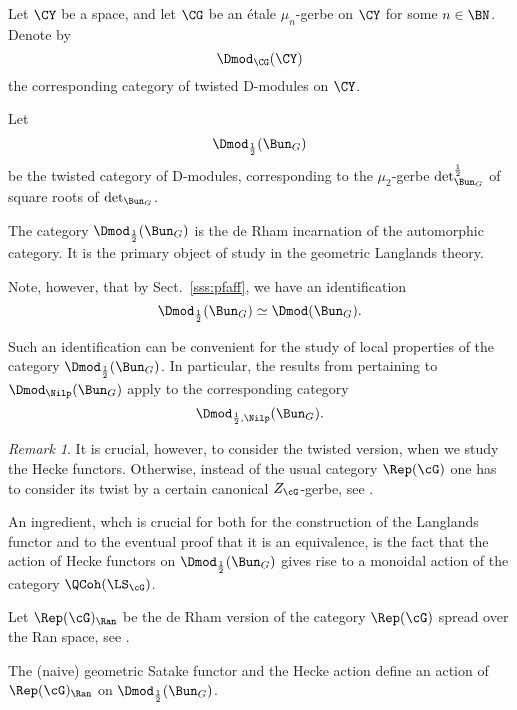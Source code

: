 \documentclass[9pt]{amsart}
\theoremstyle{remark}
\newtheorem{rem}[subsubsection]{Remark}
\theoremstyle{definition}
\theoremstyle{remark}
\newcommand{\secref}[1]{Sect.~\ref{#1}}
\numberwithin{equation}{section}
\begin{document}
\sssec{}

Let $\CY$ be a space, and let $\CG$ be an \'etale $\mu_n$-gerbe on $\CY$ for some $n\in \BN$.
Denote by 
$$\Dmod_\CG(\CY)$$
the corresponding category of twisted D-modules on $\CY$.

\sssec{} \label{sss:autom categ}

Let $$\Dmod_{\frac{1}{2}}(\Bun_G)$$
be the twisted category of D-modules, corresponding to the $\mu_2$-gerbe $\det^{\frac{1}{2}}_{\Bun_G}$ of square roots of $\det_{\Bun_G}$. 

\medskip

The category $\Dmod_{\frac{1}{2}}(\Bun_G)$ is the de Rham incarnation of 
the automorphic category. It is the primary object
of study in the geometric Langlands theory.  

\sssec{}

Note, however, that by \secref{sss:pfaff}, we have an identification
\begin{equation} \label{e:untwist}
\Dmod_{\frac{1}{2}}(\Bun_G)\simeq \Dmod(\Bun_G).
\end{equation}

Such an identification can be convenient for the study of local properties of the category 
$\Dmod_{\frac{1}{2}}(\Bun_G)$. In particular, the results from \cite{AGKRRV} pertaining
to $\Dmod_\Nilp(\Bun_G)$ apply to the corresponding category 
$$\Dmod_{\frac{1}{2},\Nilp}(\Bun_G).$$

\begin{rem}
It is crucial, however, to consider the twisted version, when we study the Hecke functors. 
Otherwise, instead of the usual category $\Rep(\cG)$ one has to consider its twist by a 
certain canonical $Z_\cG$-gerbe, see \cite[Sect. 6.3]{GLys}.
\end{rem} 

 \label{ss:spectral}

An ingredient, whch is crucial for both for the construction of the Langlands functor and to the eventual proof
that it is an equivalence, is the fact that the action of Hecke functors on $\Dmod_{\frac{1}{2}}(\Bun_G)$
gives rise to a monoidal action of the category $\QCoh(\LS_\cG)$.

\sssec{}

Let $\Rep(\cG)_\Ran$ be the de Rham version of the category $\Rep(\cG)$ spread over
the Ran space, see \cite[Sect. 4.2]{Ga2}.

\medskip

The (naive) geometric Satake functor and the Hecke action 
define an action of $\Rep(\cG)_\Ran$ on $\Dmod_{\frac{1}{2}}(\Bun_G)$.
\end{document}
